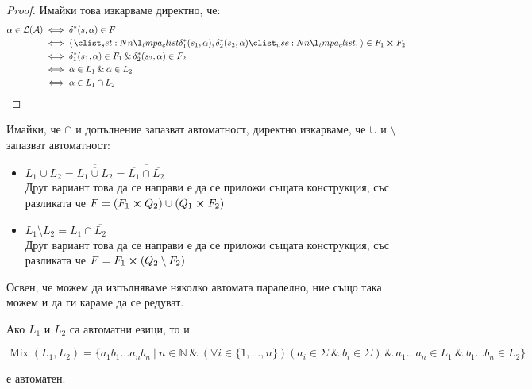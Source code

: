 \begin{proof}
    Имайки това изкарваме директно, че:
    \begin{align*}
        \alpha \in \mathcal{L(A)} & \iff \delta^*(s, \alpha) \in F                                                   \\
                                  & \iff \opair{\delta_1^*(s_1, \alpha), \delta_2^*(s_2, \alpha)} \in F_1 \cross F_2 \\
                                  & \iff \delta_1^*(s_1, \alpha) \in F_1 \: \& \: \delta_2^*(s_2, \alpha) \in F_2    \\
                                  & \iff \alpha \in L_1 \: \& \: \alpha \in L_2                                      \\
                                  & \iff \alpha \in L_1 \cap L_2
    \end{align*}
\end{proof}

Имайки, че $\cap$ и допълнение запазват автоматност, директно изкарваме, че $\cup$ и $\setminus$ запазват автоматност:
\begin{itemize}
    \item $L_1 \cup L_2 = \overline{\overline{L_1 \cup L_2}} = \overline{\overline{L_1} \cap \overline{L_2}}$ \\
          Друг вариант това да се направи е да се приложи същата конструкция, със разликата че $F = (F_1 \cross Q_2) \cup (Q_1 \cross F_2)$
    \item $L_1 \setminus L_2 = L_1 \cap \overline{L_2}$ \\
          Друг вариант това да се направи е да се приложи същата конструкция, със разликата че $F = F_1 \cross (Q_2 \setminus F_2)$
\end{itemize}

Освен, че можем да изпълняваме няколко автомата паралелно, ние също така можем и да ги караме да се редуват.

\begin{claim}
    Ако $L_1$ и $L_2$ са автоматни езици, то и
    \begin{center}
        $\operatorname{Mix}(L_1, L_2) = \{ a_1b_1 \dots a_nb_n \: | \: n \in \mathbb{N} \: \& \: (\forall i \in \{ 1, \dots, n \})(a_i \in \Sigma \: \& \: b_i \in \Sigma) \: \& \: a_1 \dots a_n \in L_1 \: \& \: b_1 \dots b_n \in L_2 \}$
    \end{center}
    е автоматен.
\end{claim}

